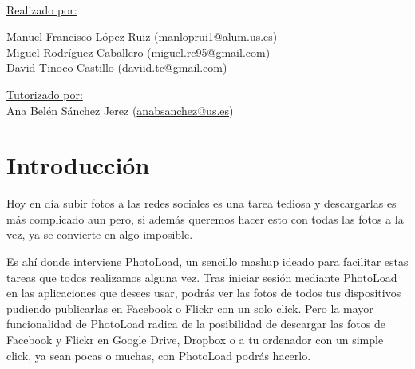 \documentclass{scrartcl}
\begin{document}
\begin{titlepage}
\begin{center}
\begin{Large}
	\end{Large}\\
	\vspace*{0.4in}
	\underline{Realizado por:} \\
		\vspace*{0.1in}
		\begin{large}
		Manuel Francisco López Ruiz (\href{mailto:manloprui1@alum.us.es}{manloprui1@alum.us.es})\\
		Miguel Rodríguez Caballero (\href{mailto:miguel.rc95@gmail.com}{miguel.rc95@gmail.com})\\
		David Tinoco Castillo (\href{mailto:daviid.tc@gmail.com}{daviid.tc@gmail.com})\\ 
		\end{large}
		\vspace*{0.2in}
		\underline{Tutorizado por:}\\
		\vspace*{0.1in}
		Ana Belén Sánchez Jerez (\href{mailto:anabsanchez@us.es}{anabsanchez@us.es})\\

	
	
\end{center}
\end{titlepage}
\newpage

\tableofcontents %
\newpage

\section{Introducción}
Hoy en día subir fotos a las redes sociales es una tarea tediosa y descargarlas es más complicado aun pero, si además queremos hacer esto con todas las fotos a la vez, ya se convierte en algo imposible.

Es ahí donde interviene PhotoLoad, un sencillo mashup ideado para facilitar estas tareas que todos realizamos alguna vez. Tras iniciar sesión mediante PhotoLoad en las aplicaciones que desees usar, podrás ver las fotos de todos tus dispositivos pudiendo publicarlas en Facebook o Flickr con un solo click. Pero la mayor funcionalidad de PhotoLoad radica de la posibilidad de descargar las fotos de Facebook y Flickr en Google Drive, Dropbox o a tu ordenador con un simple click, ya sean pocas o muchas, con PhotoLoad podrás hacerlo. 


\end{document}
